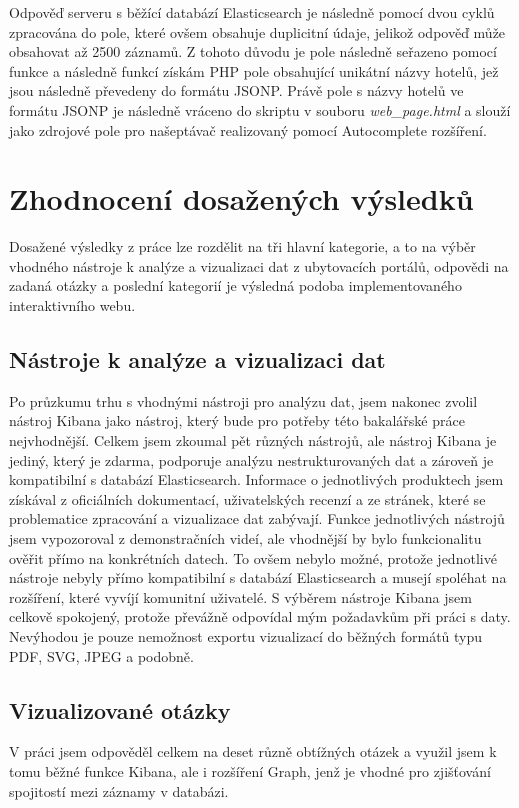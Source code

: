 \documentclass[czech,BP]{thesiskiv}
\begin{document}
Odpověď serveru s běžící databází Elasticsearch je následně pomocí dvou cyklů zpracována do pole, které ovšem obsahuje duplicitní údaje, jelikož odpověď může obsahovat až 2500 záznamů. Z tohoto důvodu je pole následně seřazeno pomocí funkce  a následně funkcí  získám PHP pole obsahující unikátní názvy hotelů, jež jsou následně převedeny do formátu JSONP. Právě pole s názvy hotelů ve formátu JSONP je následně vráceno do skriptu v souboru \textit{web\_page.html} a slouží jako zdrojové pole pro našeptávač realizovaný pomocí Autocomplete rozšíření.

\chapter{Zhodnocení dosažených výsledků}
Dosažené výsledky z práce lze rozdělit na tři hlavní kategorie, a to na výběr vhodného nástroje k analýze a  vizualizaci dat z ubytovacích portálů, odpovědi na zadaná otázky a poslední kategorií je výsledná podoba implementovaného interaktivního webu.

\section{Nástroje k analýze a vizualizaci dat}
Po průzkumu trhu s vhodnými nástroji pro analýzu dat, jsem nakonec zvolil nástroj Kibana jako nástroj, který bude pro potřeby této bakalářské práce nejvhodnější.  Celkem jsem zkoumal pět různých nástrojů, ale nástroj Kibana je jediný, který je zdarma, podporuje analýzu nestrukturovaných dat a zároveň je kompatibilní s databází Elasticsearch. Informace o jednotlivých  produktech jsem získával z oficiálních dokumentací, uživatelských recenzí a ze stránek, které se problematice zpracování a vizualizace dat zabývají. Funkce jednotlivých nástrojů jsem vypozoroval z demonstračních videí, ale vhodnější by bylo funkcionalitu ověřit přímo na konkrétních datech. To ovšem nebylo možné, protože jednotlivé nástroje nebyly přímo kompatibilní s databází Elasticsearch a musejí spoléhat na rozšíření, které vyvíjí komunitní uživatelé. S výběrem nástroje Kibana jsem celkově spokojený, protože převážně odpovídal mým požadavkům při práci s daty. Nevýhodou je pouze nemožnost exportu vizualizací do běžných formátů typu PDF, SVG, JPEG a podobně.

\section{Vizualizované otázky}
V práci jsem odpověděl celkem na deset různě obtížných otázek a využil jsem k tomu běžné funkce Kibana, ale i rozšíření Graph, jenž je vhodné pro zjišťování spojitostí mezi záznamy v databázi. 
\end{document}
